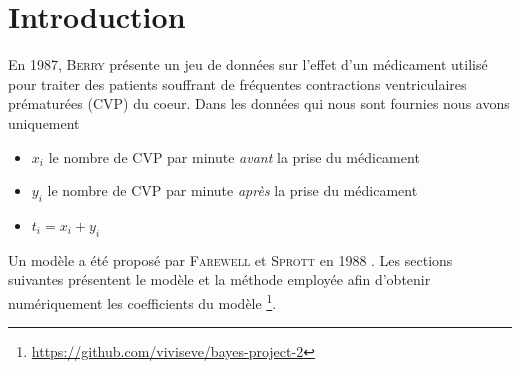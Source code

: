 \section{Introduction}
En 1987, \textsc{Berry} présente un jeu de données \cite{Berry1987} sur l'effet d'un médicament utilisé pour traiter des patients souffrant de fréquentes contractions ventriculaires prématurées (CVP) du coeur.
Dans les données qui nous sont fournies nous avons uniquement
\begin{itemize}
    \item $x_i$ le nombre de CVP par minute \textit{avant} la prise du médicament
    \item $y_i$ le nombre de CVP par minute \textit{après} la prise du médicament
    \item $t_i = x_i + y _i$
\end{itemize}

Un modèle a été proposé par \textsc{Farewell} et \textsc{Sprott} en 1988 \cite{Farewell1988}.
Les sections suivantes présentent le modèle et la méthode employée afin d'obtenir numériquement les coefficients du modèle \footnote{\url{https://github.com/viviseve/bayes-project-2}}.